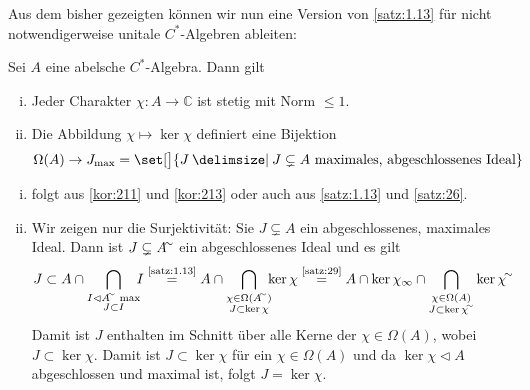 Aus dem bisher gezeigten können wir nun eine Version von \autoref{satz:1.13} für nicht notwendigerweise unitale $C^*$-Algebren ableiten: 

\begin{korollar}[{name=[Stetigkeit von Charakteren und Zusammenhang mit maximalen Idealen]}]
	Sei $A$ eine abelsche $C^*$-Algebra. Dann gilt
	\begin{enumerate}[(i),itemsep=0pt]
		\item Jeder Charakter $\chi \colon A \to \mathbb{C}$ ist stetig mit Norm $\le 1$.
		\item Die Abbildung $\chi \mapsto \ker \chi$ definiert eine Bijektion 
		\[
			\Omega(A) \to J_{\max} = \set[\big]{J \given J \subsetneq A \text{ maximales, abgeschlossenes Ideal}}
		\]
	\end{enumerate}
\end{korollar}
\begin{beweis}
	\leavevmode
	\begin{enumerate}[(i),itemsep=0pt]
		\item folgt aus \autoref{kor:211} und \autoref{kor:213} oder auch aus \autoref{satz:1.13} und \autoref{satz:26}.
		\item Wir zeigen nur die Surjektivität: Sie $J \subsetneq A$ ein abgeschlossenes, maximales Ideal. Dann ist $J \subsetneq A^\simm$ ein abgeschlossenes Ideal und es gilt
		\begin{align}
			J \subset A \cap \bigcap_{\substack{I \lhd A^\simm \text{ max} \\ J \subset I} } \hspace{-1ex} I  
			\StackText{\ref{satz:1.13}}{=} A \cap \bigcap_{\substack{\chi \in \Omega(A^\simm) \\ J \subset \ker \chi}} \hspace{-1ex}\ker \chi 
			&\StackText{\ref{satz:29}}{=} A \cap \ker \chi_\infty \cap \bigcap_{\substack{\chi \in \Omega(A) \\ J \subset \ker \chi^\simm}} \ker \chi^\simm  
		\end{align}
		Damit ist $J$ enthalten im Schnitt über alle Kerne der $\chi \in \Omega(A)$, wobei $J \subset \ker \chi$. Damit ist $J \subset \ker \chi$ für ein $\chi \in \Omega(A)$ und
		da $\ker \chi \lhd A$ abgeschlossen und maximal ist, folgt $J=\ker \chi$. \qedhere
	\end{enumerate}
\end{beweis}

